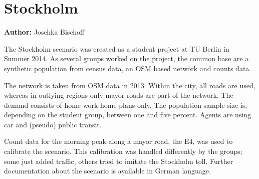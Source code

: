 \section{Stockholm}
\label{sec:stockholm}
\hfill \textbf{Author:} Joschka Bischoff

The Stockholm scenario was created as a student project at TU Berlin in Summer 2014. As several groups worked on the project, the common base are a synthetic population from census data, an OSM based network and counts data.

The network is taken from OSM data in 2013. Within the city, all roads are used, whereas in outlying regions only mayor roads are part of the network.
The demand consists of home-work-home-plans only. The population sample size is, depending on the student group, between one and five percent. Agents are using car and (pseudo) public transit.

Count data for the morning peak along a mayor road, the E4, was used to calibrate the scenario. This calibration was handled differently by the groups; some just added traffic, others tried to imitate the Stockholm toll. Further documentation about the scenario is available in German language. 

